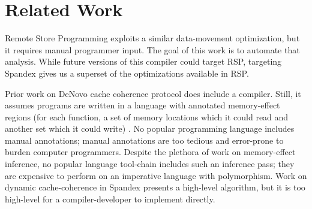 \section{Related Work}
\label{related_work}

Remote Store Programming \cite{remote_store_programming} exploits a similar data-movement optimization, but it requires manual programmer input. The goal of this work is to automate that analysis. While future versions of this compiler could target RSP, targeting Spandex gives us a superset of the optimizations available in RSP.

Prior work on DeNovo cache coherence protocol does include a compiler. Still, it assumes programs are written in a language with annotated memory-effect regions (for each function, a set of memory locations which it could read and another set which it could write) \cite{DeNovo}. No popular programming language includes manual annotations; manual annotations are too tedious and error-prone to burden computer programmers. Despite the plethora of work \cite{effect_and_effect_inference_java,polymorphic_effect_systems,OO_effect_system} on memory-effect inference, no popular language tool-chain includes such an inference pass; they are expensive to perform on an imperative language with polymorphism. 
Work on dynamic cache-coherence in Spandex \cite{dynamic_cache_coherence} presents a high-level algorithm, but it is too high-level for a compiler-developer to implement directly. 